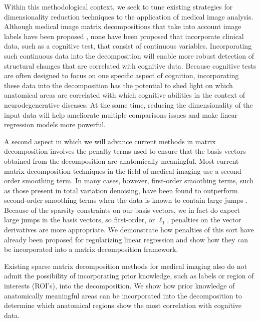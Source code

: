 \documentclass[11pt]{nih}
\begin{document}
Within this methodological context, we seek to tune existing strategies for dimensionality reduction techniques to the application of medical image analysis.  Although medical image matrix decompositions that take into account image labels have been proposed \cite{batmanghelich_general_2009}, none have been proposed that incorporate clinical data, such as a cognitive test, that consist of  continuous variables.  Incorporating  such continuous data into the decomposition will enable more robust detection of structural changes that are correlated with cognitive data.  Because cognitive tests are often designed to focus on one specific aspect of cognition, incorporating these data into the decomposition has the potential to shed light on which anatomical areas are correlated with which cognitive abilities in the context of neurodegenerative diseases.   At the same time, reducing the dimensionality of the input data will help ameliorate multiple comparisons issues and make linear regression models more powerful.  

A second aspect in which we will advance current methods in matrix decomposition involves the penalty terms used to ensure that the basis vectors obtained from the decomposition are anatomically meaningful. Most current matrix decomposition techniques in the field of medical imaging use a second-order smoothing term.  In many cases, however, first-order smoothing terms, such as those present in total variation denoising, have been found to outperform second-order smoothing terms when the data is known to contain large jumps \cite{rudin_nonlinear_1992}.  Because of the sparsity constraints on our basis vectors, we in fact do expect large jumps in the basis vectors, so first-order, or $\ell_1$, penalties on the vector derivatives are more appropriate.  We demonstrate how penalties of this sort have already been proposed for regularizing linear regression and show how they can be incorporated into a matrix decomposition framework.  

Existing sparse matrix decomposition methods for medical imaging also do not admit the possibility of incorporating prior knowledge, such as labels or region of interests (ROI's), into the decomposition.  We show how prior knowledge of anatomically meaningful areas can be incorporated into the decomposition to determine which anatomical regions show the most correlation with cognitive data. 
\end{document}
